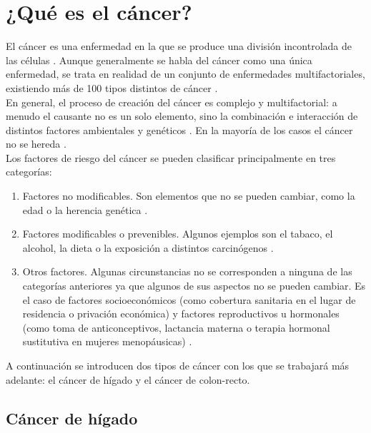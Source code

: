 
\section{¿Qué es el cáncer?}

El cáncer es una enfermedad en la que se produce una división incontrolada de las células \cite{AmericanCancerSociety2015}. Aunque generalmente se habla del cáncer como una única enfermedad, se trata en realidad de un conjunto de enfermedades multifactoriales, existiendo más de 100 tipos distintos de cáncer \cite{NationalCancerInstitute2015}.\\

En general, el proceso de creación del cáncer es complejo y multifactorial: a menudo el causante no es un solo elemento, sino la combinación e interacción de distintos factores ambientales y genéticos \cite{Migliore2012}. En la mayoría de los casos el cáncer no se hereda \cite{Pierce2010}. \\

Los factores de riesgo del cáncer se pueden clasificar principalmente en tres categorías:
\begin{enumerate}
	\item Factores no modificables. Son elementos que no se pueden cambiar, como la edad o la herencia genética \cite{WorldHealthOrganization2014, WorldHealthOrganization2020}.
	\item Factores modificables o prevenibles. Algunos ejemplos son el tabaco, el alcohol, la dieta o la exposición a distintos carcinógenos \cite{Cogliano2011}.
	\item Otros factores. Algunas circunstancias no se corresponden a ninguna de las categorías anteriores ya que algunos de sus aspectos no se pueden cambiar. Es el caso de  factores socioeconómicos (como cobertura sanitaria en el lugar de residencia o privación económica) y factores reproductivos u hormonales (como toma de anticonceptivos, lactancia materna o terapia hormonal sustitutiva en mujeres menopáusicas) \cite{WorldHealthOrganization2020}.
\end{enumerate}

A continuación se introducen dos tipos de cáncer con los que se trabajará más adelante: el cáncer de hígado y el cáncer de colon-recto.


\subsection{Cáncer de hígado}

